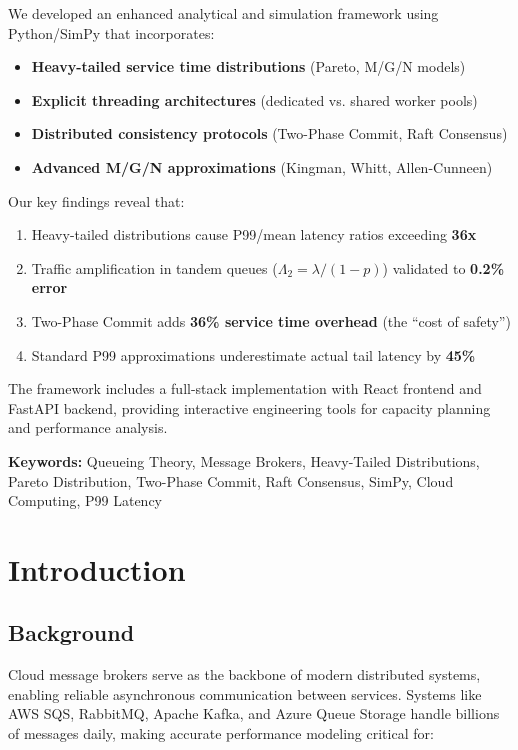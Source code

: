 \documentclass[11pt,a4paper]{article}
\begin{document}
We developed an enhanced analytical and simulation framework using Python/SimPy that incorporates:
\begin{itemize}
    \item \textbf{Heavy-tailed service time distributions} (Pareto, M/G/N models)
    \item \textbf{Explicit threading architectures} (dedicated vs. shared worker pools)
    \item \textbf{Distributed consistency protocols} (Two-Phase Commit, Raft Consensus)
    \item \textbf{Advanced M/G/N approximations} (Kingman, Whitt, Allen-Cunneen)
\end{itemize}

Our key findings reveal that:
\begin{enumerate}
    \item Heavy-tailed distributions cause P99/mean latency ratios exceeding \textbf{36x}
    \item Traffic amplification in tandem queues ($\Lambda_2 = \lambda/(1-p)$) validated to \textbf{0.2\% error}
    \item Two-Phase Commit adds \textbf{36\% service time overhead} (the ``cost of safety'')
    \item Standard P99 approximations underestimate actual tail latency by \textbf{45\%}
\end{enumerate}

The framework includes a full-stack implementation with React frontend and FastAPI backend, providing interactive engineering tools for capacity planning and performance analysis.

\textbf{Keywords:} Queueing Theory, Message Brokers, Heavy-Tailed Distributions, Pareto Distribution, Two-Phase Commit, Raft Consensus, SimPy, Cloud Computing, P99 Latency


\section{Introduction}

\subsection{Background}

Cloud message brokers serve as the backbone of modern distributed systems, enabling reliable asynchronous communication between services. Systems like AWS SQS, RabbitMQ, Apache Kafka, and Azure Queue Storage handle billions of messages daily, making accurate performance modeling critical for:
\end{document}

